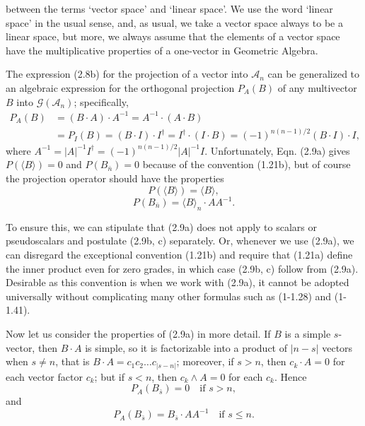 \documentclass[fleqn]{scrartcl}
\numberwithin{equation}{section}
\begin{document}
\noindent between the terms `vector space' and `linear space'. We use the word `linear space' in the usual sense, and, as usual, we take a vector space always to be a linear space, but more, we always assume that the elements of a vector space have the multiplicative properties of a one-vector in Geometric Algebra.

\vspace{1em}
\noindent The expression (2.8b) for the projection of a vector into \(\mathscr{A}_n\) can be generalized to an algebraic expression for the orthogonal projection \(P_A(B)\) of any multivector \(B\) into \(\mathscr{G}(\mathscr{A}_n)\); specifically,
\begin{equation}
\begin{aligned}
P_A(B) &= (B \cdot A) \cdot A^{-1} = A^{-1} \cdot (A \cdot B) \\
&= P_I(B) = (B \cdot I) \cdot I^{\dagger} = I^{\dagger} \cdot (I \cdot B) = (-1)^{n(n-1)/2} (B \cdot I) \cdot I,
\end{aligned}
\tag{2.9a}
\end{equation}
where \(A^{-1} = |A|^{-1} I^{\dagger} = (-1)^{n(n-1)/2} |A|^{-1} I\). Unfortunately, Eqn. (2.9a) gives \(P(\langle B \rangle) = 0\) and \(P(B_{\bar{n}}) = 0\) because of the convention (1.21b), but of course the projection operator should have the properties
\begin{equation}
P(\langle B \rangle) = \langle B \rangle, \tag{2.9b}
\end{equation}
\begin{equation}
P(B_{\bar{n}}) = \langle B \rangle_n \cdot AA^{-1}. \tag{2.9c}
\end{equation}

\noindent To ensure this, we can stipulate that (2.9a) does not apply to scalars or pseudoscalars and postulate (2.9b, c) separately. Or, whenever we use (2.9a), we can disregard the exceptional convention (1.21b) and require that (1.21a) define the inner product even for zero grades, in which case (2.9b, c) follow from (2.9a). Desirable as this convention is when we work with (2.9a), it cannot be adopted universally without complicating many other formulas such as (1-1.28) and (1-1.41).

\vspace{1em}
\noindent Now let us consider the properties of (2.9a) in more detail. If \(B\) is a simple \(s\)-vector, then \(B \cdot A\) is simple, so it is factorizable into a product of \(|n-s|\) vectors when \(s \neq n\), that is \(B \cdot A = c_1 c_2 \dots c_{|s-n|}\); moreover, if \(s > n\), then \(c_k \cdot A = 0\) for each vector factor \(c_k\); but if \(s < n\), then \(c_k \wedge A = 0\) for each \(c_k\). Hence
\begin{equation}
P_A(B_{\bar{s}}) = 0 \quad \text{if } s > n, \tag{2.10a}
\end{equation}
and
\begin{equation}
P_A(B_{\bar{s}}) = B_{\bar{s}} \cdot AA^{-1} \quad \text{if } s \leq n. \tag{2.10b}
\end{equation}
\end{document}
